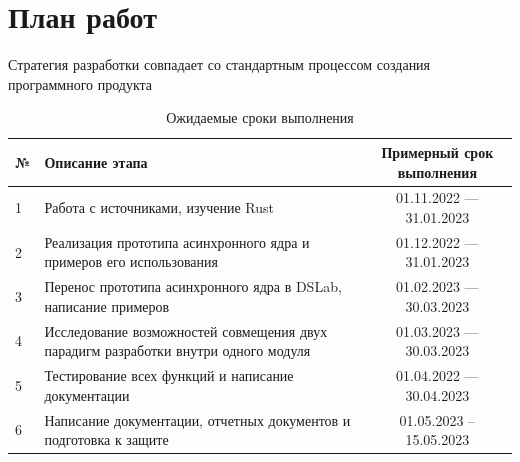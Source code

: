 \section{План работ}

Стратегия разработки совпадает со стандартным процессом создания программного продукта 

\begin{table}[!h]
	\centering
\begin{tabular}{|l|p{25em}|c|}
	\hline
№	& Описание этапа &  Примерный срок выполнения \\
	\hline
	1 & Работа с источниками, изучение Rust &  01.11.2022 --- 31.01.2023\\ 
	\hline
2 & Реализация прототипа асинхронного ядра и примеров его использования & 01.12.2022 --- 31.01.2023 \\
	\hline
3	& Перенос прототипа асинхронного ядра в DSLab, написание примеров &  01.02.2023 --- 30.03.2023 \\
\hline
4	& Исследование возможностей совмещения двух парадигм разработки внутри одного модуля &  01.03.2023 --- 30.03.2023 \\
	\hline
5	& Тестирование всех функций и написание документации &  01.04.2022 --- 30.04.2023  \\
	\hline
6	& Написание документации, отчетных документов и подготовка к защите & 01.05.2023 -- 15.05.2023 \\
	\hline
\end{tabular}
	\caption{Ожидаемые сроки выполнения}
	\label{table1}
\end{table}
